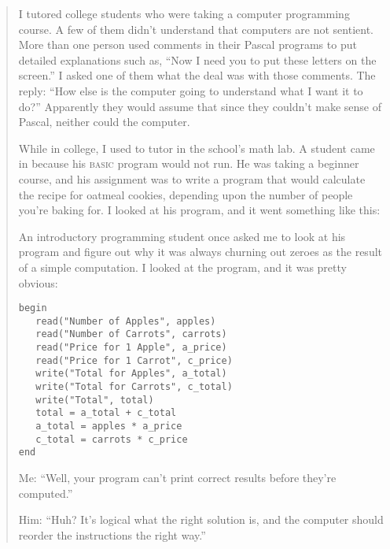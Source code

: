 \begin{quote}

 I tutored college students who were taking a computer programming
course. A few of them didn't understand that computers
are not sentient. More than one person used comments in their Pascal
programs to put detailed explanations such as, ``Now I
need you to put these letters on the screen.'' I
asked one of them what the deal was with those comments. The reply:
``How else is the computer going to understand what I
want it to do?'' Apparently they would assume that
since they couldn't make sense of Pascal, neither could
the computer.

\hr


 While in college, I used to tutor in the school's
math lab. A student came in because his \textsc{basic} program would not run. He
was taking a beginner course, and his assignment was to write a program
that would calculate the recipe for oatmeal cookies, depending upon the
number of people you're baking for. I looked at his
program, and it went something like this:


\hr


 An introductory programming student once asked me to look at his
program and figure out why it was always churning out zeroes as the
result of a simple computation. I looked at the program, and it was
pretty obvious:

\begin{verbatim}
begin
   read("Number of Apples", apples)
   read("Number of Carrots", carrots)
   read("Price for 1 Apple", a_price)
   read("Price for 1 Carrot", c_price)
   write("Total for Apples", a_total)
   write("Total for Carrots", c_total)
   write("Total", total)
   total = a_total + c_total
   a_total = apples * a_price
   c_total = carrots * c_price
end
\end{verbatim}


 Me: ``Well, your program can't
print correct results before they're
computed.''

{
 Him: ``Huh? It's logical what the
right solution is, and the computer should reorder the instructions the
right way.''}
\end{quote}


